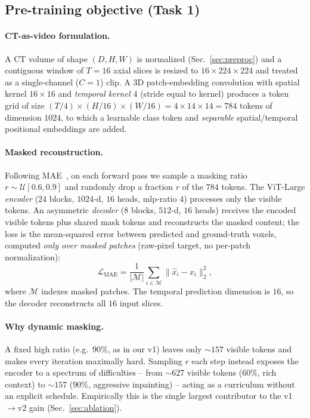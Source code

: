 \documentclass[runningheads]{llncs}
\begin{document}
\subsection{Pre-training objective (Task 1)}

\paragraph{CT-as-video formulation.}
A CT volume of shape $(D,H,W)$ is normalized (Sec.~\ref{sec:preproc}) and a
contiguous window of $T{=}16$ axial slices is resized to $16{\times}224{\times}224$
and treated as a single-channel ($C{=}1$) clip. A 3D patch-embedding convolution
with spatial kernel $16{\times}16$ and \emph{temporal kernel $4$} (stride equal
to kernel) produces a token grid of size $(T/4)\times(H/16)\times(W/16)=
4{\times}14{\times}14=784$ tokens of dimension $1024$, to which a learnable
class token and \emph{separable} spatial/temporal positional embeddings are
added.

\paragraph{Masked reconstruction.}
Following MAE~\cite{mae,maest}, on each forward pass we sample a masking ratio
$r\sim\mathcal{U}[0.6,0.9]$ and randomly drop a fraction $r$ of the $784$ tokens.
The ViT-Large \emph{encoder} ($24$ blocks, $1024$-d, $16$ heads,
mlp-ratio $4$) processes only the visible tokens. An asymmetric
\emph{decoder} ($8$ blocks, $512$-d, $16$ heads) receives the encoded visible
tokens plus shared mask tokens and reconstructs the masked content; the loss is
the mean-squared error between predicted and ground-truth voxels, computed
\emph{only over masked patches} (raw-pixel target, no per-patch normalization):
\[
\mathcal{L}_{\text{MAE}}
= \frac{1}{|\mathcal{M}|}\sum_{i\in\mathcal{M}}\big\lVert \hat{x}_i - x_i \big\rVert_2^2 ,
\]
where $\mathcal{M}$ indexes masked patches. The temporal prediction dimension is
$16$, so the decoder reconstructs all $16$ input slices.

\paragraph{Why dynamic masking.}
A fixed high ratio (e.g.\ $90\%$, as in our v1) leaves only $\sim\!157$ visible
tokens and makes every iteration maximally hard. Sampling $r$ each step instead
exposes the encoder to a spectrum of difficulties -- from $\sim\!627$ visible
tokens ($60\%$, rich context) to $\sim\!157$ ($90\%$, aggressive inpainting) --
acting as a curriculum without an explicit schedule. Empirically this is the
single largest contributor to the v1$\to$v2 gain (Sec.~\ref{sec:ablation}).
\end{document}
